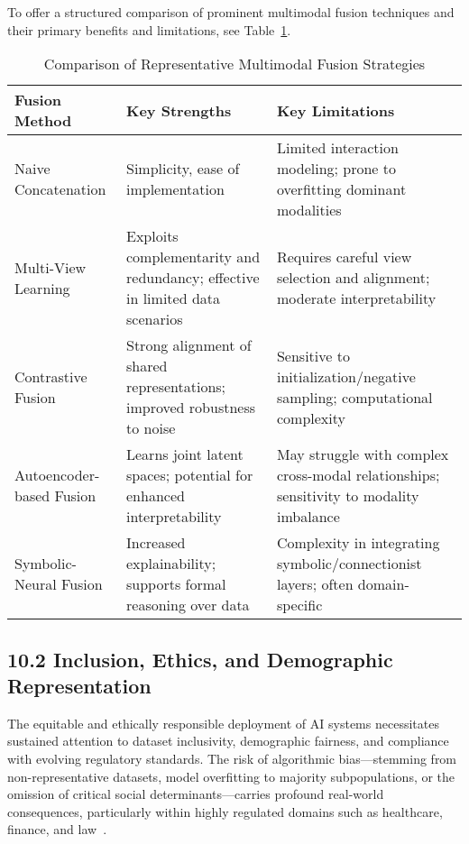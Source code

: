 \documentclass[11pt]{article}
\begin{document}
To offer a structured comparison of prominent multimodal fusion techniques and their primary benefits and limitations, see Table~\ref{tab:fusion_comparison}.

\begin{table}[ht]
\centering
\caption{Comparison of Representative Multimodal Fusion Strategies}
\label{tab:fusion_comparison}
\begin{tabular}{|l|p{4.5cm}|p{4.5cm}|}
\hline
\textbf{Fusion Method} & \textbf{Key Strengths} & \textbf{Key Limitations} \\
\hline
Naive Concatenation & Simplicity, ease of implementation & Limited interaction modeling; prone to overfitting dominant modalities \\
\hline
Multi-View Learning & Exploits complementarity and redundancy; effective in limited data scenarios & Requires careful view selection and alignment; moderate interpretability \\
\hline
Contrastive Fusion & Strong alignment of shared representations; improved robustness to noise & Sensitive to initialization/negative sampling; computational complexity \\
\hline
Autoencoder-based Fusion & Learns joint latent spaces; potential for enhanced interpretability & May struggle with complex cross-modal relationships; sensitivity to modality imbalance \\
\hline
Symbolic-Neural Fusion & Increased explainability; supports formal reasoning over data & Complexity in integrating symbolic/connectionist layers; often domain-specific\\
\hline
\end{tabular}
\end{table}

\subsection{10.2 Inclusion, Ethics, and Demographic Representation}

The equitable and ethically responsible deployment of AI systems necessitates sustained attention to dataset inclusivity, demographic fairness, and compliance with evolving regulatory standards. The risk of algorithmic bias—stemming from non-representative datasets, model overfitting to majority subpopulations, or the omission of critical social determinants—carries profound real-world consequences, particularly within highly regulated domains such as healthcare, finance, and law~\cite{1,2,10,21,22,23,42,43,44,49,52,53,65}.
\end{document}
